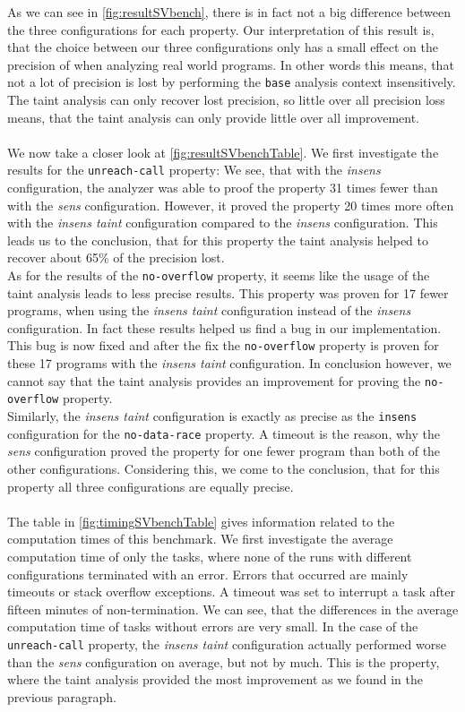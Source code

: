      As we can see in \autoref{fig:resultSVbench}, there is in fact not a big difference between the three configurations for each property. Our interpretation of this result is, that the choice between our three configurations only has a small effect on the precision of \gob when analyzing real world programs. In other words this means, that not a lot of precision is lost by performing the \texttt{base} analysis context insensitively. The taint analysis can only recover lost precision, so little over all precision loss means, that the taint analysis can only provide little over all improvement.\\
      \\
      We now take a closer look at \autoref{fig:resultSVbenchTable}. We first investigate the results for the \texttt{unreach-call} property: We see, that with the \textit{insens} configuration, the analyzer was able to proof the property 31 times fewer than with the \textit{sens} configuration. However, it proved the property 20 times more often with the \textit{insens taint} configuration compared to the \textit{insens} configuration. This leads us to the conclusion, that for this property the taint analysis helped to recover about 65\% of the precision lost.\\
      As for the results of the \texttt{no-overflow} property, it seems like the usage of the taint analysis leads to less precise results. This property was proven for 17 fewer programs, when using the \textit{insens taint} configuration instead of the \textit{insens} configuration. In fact these results helped us find a bug in our implementation. This bug is now fixed and after the fix the \texttt{no-overflow} property is proven for these 17 programs with the \textit{insens taint} configuration. In conclusion however, we cannot say that the taint analysis provides an improvement for proving the \texttt{no-overflow} property.\\
      Similarly, the \textit{insens taint} configuration is exactly as precise as the \texttt{insens} configuration for the \texttt{no-data-race} property. A timeout is the reason, why the \textit{sens} configuration proved the property for one fewer program than both of the other configurations. Considering this, we come to the conclusion, that for this property all three configurations are equally precise.\\
      \\
      The table in \autoref{fig:timingSVbenchTable} gives information related to the computation times of this benchmark. We first investigate the average computation time of only the tasks, where none of the runs with different configurations terminated with an error. Errors that occurred are mainly timeouts or stack overflow exceptions. A timeout was set to interrupt a task after fifteen minutes of non-termination. We can see, that the differences in the average computation time of tasks without errors are very small. In the case of the \texttt{unreach-call} property, the \textit{insens taint} configuration actually performed worse than the \textit{sens} configuration on average, but not by much. This is the property, where the taint analysis provided the most improvement as we found in the previous paragraph.\\
